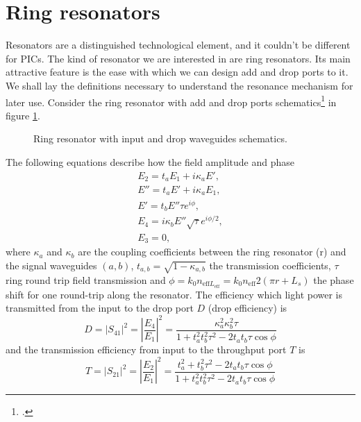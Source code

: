 \documentclass[12pt,twoside,english]{book}
\renewcommand{\~}{\perispomeni}%
\numberwithin{equation}{section}
\numberwithin{figure}{section}
\begin{document}
\section{Ring resonators}
Resonators are a distinguished technological element, and it couldn't be different for PICs. The kind of resonator we are interested in are ring resonators. Its main attractive feature is the ease with which we can design add and drop ports to it. We shall lay the definitions necessary to understand the resonance mechanism for later use.
Consider the ring resonator with add and drop ports schematics\footcite{Little:1997p39,Vorckel:2003p86} in figure \ref{fig:ring-resonator}.
\begin{figure}[H]
\center{}\caption{Ring resonator with input and drop waveguides schematics.\label{fig:ring-resonator}}
\end{figure}
The following equations describe how the field amplitude and phase
\begin{subequations}\begin{eqnarray}
E_{2}=t_{a}E_{1}+i\kappa_{a}E',\\
E''=t_{a}E'+i\kappa_{a}E_{1},\\
E'=t_{b}E''\tau e^{i\phi},\\
E_{4}=i\kappa_{b}E''\sqrt{\tau}e^{i\phi/2},\\
E_{3}=0,
\end{eqnarray}\end{subequations}
where $\kappa_a$ and $\kappa_b$ are the coupling coefficients between the ring resonator (r) and the signal waveguides $(a,b)$, $t_{a,b}=\sqrt{1-\kappa_{a,b}}$ the transmission coefficients, $\tau$ ring round trip field transmission and $\phi=k_0 n_{\text{eff}L_{\text{eff}}}=k_0 n_{\text{eff}}2\left(\pi r+L_s\right)$ the phase shift for one round-trip along the resonator.
The efficiency which light power is transmitted from the input to the drop port $D$ (drop efficiency) is 
\begin{equation}
D=\left|S_{41}\right|^{2}=\left|\frac{E_{4}}{E_{1}}\right|^{2}=\frac{\kappa_{a}^{2}\kappa_{b}^{2}\tau}{1+t_{a}^{2}t_{b}^{2}\tau^2-2t_{a}t_{b}\tau\cos\phi}
\label{eq:drop efficiency}
\end{equation}
and the transmission efficiency from input to the throughput port $T$ is
\begin{equation}
T=\left|S_{21}\right|^{2}=\left|\frac{E_{2}}{E_{1}}\right|^{2}=\frac{t_{a}^{2}+t_{b}^{2}\tau^{2}-2t_{a}t_{b}\tau\cos\phi}{1+t_{a}^{2}t_{b}^{2}\tau^2-2t_{a}t_{b}\tau\cos\phi}
\end{equation}
\end{document}
